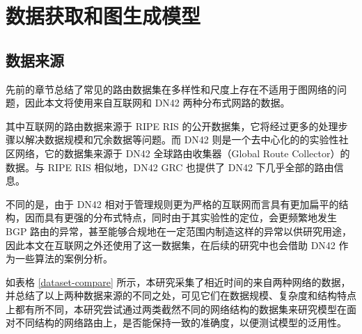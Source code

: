 \section{数据获取和图生成模型}


\subsection{数据来源}

先前的章节总结了常见的路由数据集在多样性和尺度上存在不适用于图网络的问题，因此本文将使用来自互联网和 DN42 两种分布式网路的数据。

其中互联网的路由数据来源于 RIPE RIS 的公开数据集，它将经过更多的处理步骤以解决数据规模和冗余数据等问题。而 DN42 则是一个去中心化的的实验性社区网络，它的数据集来源于 DN42 全球路由收集器（Global Route Collector）的数据。与 RIPE RIS 相似地，DN42 GRC 也提供了 DN42 下几乎全部的路由信息。 

不同的是，由于 DN42 相对于管理规则更为严格的互联网而言具有更加扁平的结构，因而具有更强的分布式特点，同时由于其实验性的定位，会更频繁地发生 BGP 路由的异常，甚至能够合规地在一定范围内制造这样的异常以供研究用途， 因此本文在互联网之外还使用了这一数据集，在后续的研究中也会借助 DN42 作为一些算法的案例分析。

如表格 \ref{dataset-compare} 所示，本研究采集了相近时间的来自两种网络的数据，并总结了以上两种数据来源的不同之处，可见它们在数据规模、复杂度和结构特点上都有所不同，本研究尝试通过两类截然不同的网络结构的数据集来研究模型在面对不同结构的网络路由上，是否能保持一致的准确度，以便测试模型的泛用性。

